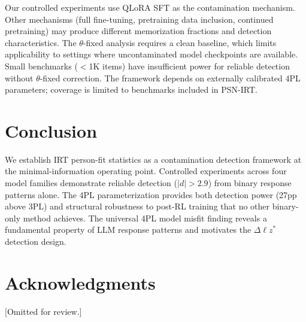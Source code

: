 \documentclass[11pt,a4paper]{article}
\newcommand{\thetafixed}{$\theta$-fixed}
\begin{document}
Our controlled experiments use QLoRA SFT as the contamination mechanism. Other mechanisms (full fine-tuning, pretraining data inclusion, continued pretraining) may produce different memorization fractions and detection characteristics. The \thetafixed{} analysis requires a clean baseline, which limits applicability to settings where uncontaminated model checkpoints are available. Small benchmarks ($<$1K items) have insufficient power for reliable detection without \thetafixed{} correction. The framework depends on externally calibrated 4PL parameters; coverage is limited to benchmarks included in PSN-IRT.

\section{Conclusion}

We establish IRT person-fit statistics as a contamination detection framework at the minimal-information operating point. Controlled experiments across four model families demonstrate reliable detection ($|d|>2.9$) from binary response patterns alone. The 4PL parameterization provides both detection power (27pp above 3PL) and structural robustness to post-RL training that no other binary-only method achieves. The universal 4PL model misfit finding reveals a fundamental property of LLM response patterns and motivates the $\Delta\ell z^*$ detection design.

\section*{Acknowledgments}

[Omitted for review.]
\end{document}

